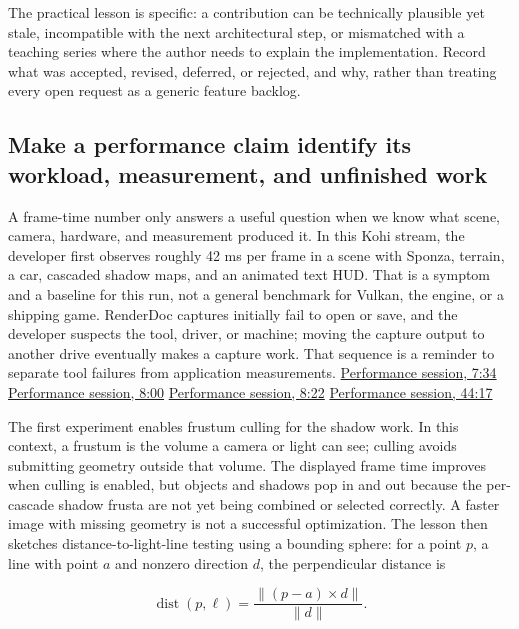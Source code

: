 The practical lesson is specific: a contribution can be technically plausible yet stale, incompatible with the next architectural step, or mismatched with a teaching series where the author needs to explain the implementation. Record what was accepted, revised, deferred, or rejected, and why, rather than treating every open request as a generic feature backlog.

\subsection{Make a performance claim identify its workload, measurement, and unfinished work}\label{06-engine-ii-ch040-make-a-performance-claim-identify-its-workload-measurement-and-unfinished-work}

A frame-time number only answers a useful question when we know what scene, camera, hardware, and measurement produced it. In this Kohi stream, the developer first observes roughly 42 ms per frame in a scene with Sponza, terrain, a car, cascaded shadow maps, and an animated text HUD. That is a symptom and a baseline for this run, not a general benchmark for Vulkan, the engine, or a shipping game. RenderDoc captures initially fail to open or save, and the developer suspects the tool, driver, or machine; moving the capture output to another drive eventually makes a capture work. That sequence is a reminder to separate tool failures from application measurements. \href{https://www.youtube.com/watch?v=dJYWL9YAelY&t=454s}{Performance session, 7:34} \href{https://www.youtube.com/watch?v=dJYWL9YAelY&t=480s}{Performance session, 8:00} \href{https://www.youtube.com/watch?v=dJYWL9YAelY&t=499s}{Performance session, 8:22} \href{https://www.youtube.com/watch?v=dJYWL9YAelY&t=2656s}{Performance session, 44:17}

The first experiment enables frustum culling for the shadow work. In this context, a frustum is the volume a camera or light can see; culling avoids submitting geometry outside that volume. The displayed frame time improves when culling is enabled, but objects and shadows pop in and out because the per-cascade shadow frusta are not yet being combined or selected correctly. A faster image with missing geometry is not a successful optimization. The lesson then sketches distance-to-light-line testing using a bounding sphere: for a point \(p\), a line with point \(a\) and nonzero direction \(d\), the perpendicular distance is

\[
\operatorname{dist}(p,\ell)=\frac{\lVert(p-a)\times d\rVert}{\lVert d\rVert}.
\]

